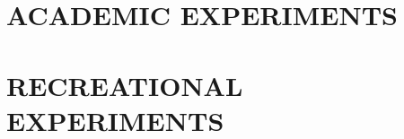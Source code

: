 \documentclass[11pt, twoside]{book}
\begin{document}
\pagestyle{empty}

\cleardoublepage

\pagestyle{fancy}
\setcounter{page}{1}

\tableofcontents
%



\setcounter{page}{1}
\fancyhead[L]{\leftmark}
\newpage
\part{ACADEMIC EXPERIMENTS}








\part{RECREATIONAL EXPERIMENTS}
\thispagestyle{empty}








\pagestyle{empty}
\afterpage{\null\newpage}
%
%
%

\end{document}
